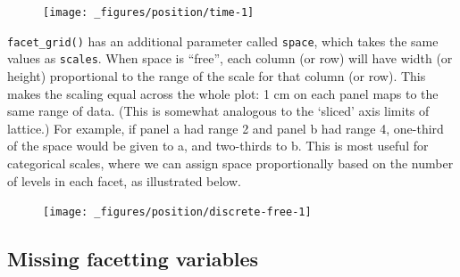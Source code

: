 \begin{figure}[H]
  \centering
  \texttt{[image: \_figures/position/time-1]}
\end{figure}

\texttt{facet\_grid()} has an additional parameter called
\texttt{space}, which takes the same values as \texttt{scales}. When
space is ``free'', each column (or row) will have width (or height)
proportional to the range of the scale for that column (or row). This
makes the scaling equal across the whole plot: 1 cm on each panel maps
to the same range of data. (This is somewhat analogous to the `sliced'
axis limits of lattice.) For example, if panel a had range 2 and panel b
had range 4, one-third of the space would be given to a, and two-thirds
to b. This is most useful for categorical scales, where we can assign
space proportionally based on the number of levels in each facet, as
illustrated below.

\begin{Shaded}
\begin{Highlighting}[]
\OperatorTok{$}\StringTok{ }\OperatorTok{$}\OperatorTok{$}
\OperatorTok{$}\StringTok{ }\OperatorTok{$}\OperatorTok{-}\OperatorTok{$}
\OperatorTok{+}\StringTok{ }
\StringTok{  }\NormalTok{() }\OperatorTok{+}\StringTok{ }
\StringTok{  }\OperatorTok{~}\StringTok{ } \NormalTok{, } \NormalTok{) }\OperatorTok{+}
\StringTok{  }\NormalTok{(} \NormalTok{(} \NormalTok{))}
\end{Highlighting}
\end{Shaded}

\begin{figure}[H]
  \centering
  \texttt{[image: \_figures/position/discrete-free-1]}
\end{figure}

\hypertarget{sub:missing-facetting-columns}{%
\subsection{Missing facetting
variables}\label{sub:missing-facetting-columns}}


